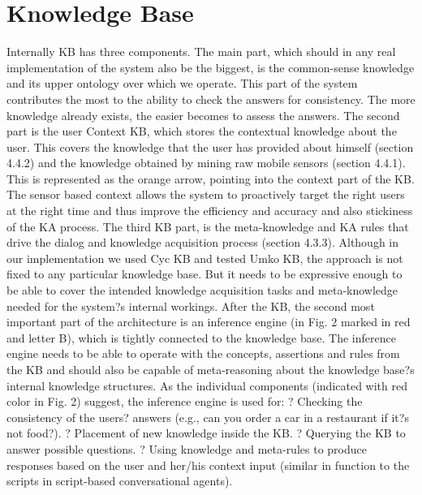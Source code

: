 \section{Knowledge Base}
Internally KB has three components. The main part, which should in any real implementation of the system also be the biggest, is the common-sense knowledge and its upper ontology over which we operate. This part of the system contributes the most to the ability to check the answers for consistency. The more knowledge already exists, the easier becomes to assess the answers. The second part is the user Context KB, which stores the contextual knowledge about the user. This covers the knowledge that the user has provided about himself (section 4.4.2) and the knowledge obtained by mining raw mobile sensors (section 4.4.1). This is represented as the orange arrow, pointing into the context part of the KB. The sensor based context allows the system to proactively target the right users at the right time and thus improve the efficiency and accuracy and also stickiness of the KA process.
The third KB part, is the meta-knowledge and KA rules that drive the dialog and knowledge acquisition process (section 4.3.3). Although in our implementation we used Cyc KB and tested Umko KB, the approach is not fixed to any particular knowledge base. But it needs to be expressive enough to be able to cover the intended knowledge acquisition tasks and meta-knowledge needed for the system?s internal workings. 
After the KB, the second most important part of the architecture is an inference engine (in Fig. 2 marked in red and letter B), which is tightly connected to the knowledge base.  The inference engine needs to be able to operate with the concepts, assertions and rules from the KB and should also be capable of meta-reasoning about the knowledge base?s internal knowledge structures. As the individual components (indicated with red color in Fig. 2) suggest, the inference engine is used for:
?	Checking the consistency of the users? answers (e.g., can you order a car in a restaurant if it?s not food?). 
?	Placement of new knowledge inside the KB.
?	Querying the KB to answer possible questions.
?	Using knowledge and meta-rules to produce responses based on the user and her/his context input (similar in function to the scripts in script-based conversational agents).

